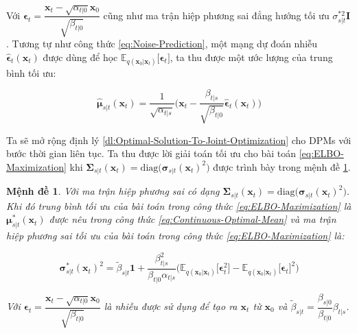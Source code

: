 \documentclass[14pt, a4paper]{article}
\numberwithin{equation}{section}
\numberwithin{figure}{section}
\newtheorem{md}{Mệnh đề}
\numberwithin{dl}{section}
\numberwithin{md}{section}
\numberwithin{bd}{section}
\numberwithin{dn}{section}
\numberwithin{hq}{section}
\begin{document}
    Với $\boldsymbol{\epsilon}_t = \dfrac{\boldsymbol{x}_t - \sqrt{\alpha_{t \vert 0}} \boldsymbol{x}_0}{\sqrt{\beta_{t \vert 0}}}$ cũng như ma trận hiệp phương sai đẳng hướng tối ưu $\sigma_{s \vert t}^{\ast 2} \boldsymbol{I}$.
    Tương tự như công thức \ref{eq:Noise-Prediction}, một mạng dự đoán nhiễu $\hat{\boldsymbol{\epsilon}}_t (\boldsymbol{x}_t)$ được dùng để học $\mathbb{E}_{q(\boldsymbol{x}_0 \vert \boldsymbol{x}_t)}  \lbrack \boldsymbol{\epsilon}_t \rbrack$,
    ta thu được một ước lượng của trung bình tối ưu:

    \begin{equation} \label{eq:Estimated-Continuous-Optimal-Mean}
        \hat{\boldsymbol{\mu}}_{s \vert t} (\boldsymbol{x}_t) = \dfrac{1}{\sqrt{\alpha_{t \vert s}}} \Big( \boldsymbol{x}_t - \dfrac{\beta_{t \vert s}}{\sqrt{\beta_{t \vert 0}}} \hat{\boldsymbol{\epsilon}}_t (\boldsymbol{x}_t) \Big)
    \end{equation}

    Ta sẽ mở rộng định lý \ref{dl:Optimal-Solution-To-Joint-Optimization} cho DPMs với bước thời gian liên tục.
    Ta thu được lời giải toán tối ưu cho bài toán \ref{eq:ELBO-Maximization} khi $\boldsymbol{\Sigma}_{s \vert t} (\boldsymbol{x}_t)=\mathrm{diag}\big(\boldsymbol{\sigma}_{s \vert t} (\boldsymbol{x}_t)^2 \big)$ được trình bày trong mệnh đề \ref{md:Continuous-Optimal-Covariance}.

    \begin{md} \label{md:Continuous-Optimal-Covariance}
        Với ma trận hiệp phương sai có dạng $\boldsymbol{\Sigma}_{s \vert t} (\boldsymbol{x}_t)=\mathrm{diag}\big(\boldsymbol{\sigma}_{s \vert t} (\boldsymbol{x}_t)^2 \big)$.
        Khi đó trung bình tối ưu của bài toán trong công thức \ref{eq:ELBO-Maximization} là $\boldsymbol{\mu}_{s \vert t}^{\ast} (\boldsymbol{x}_t)$ được nêu trong công thức \ref{eq:Continuous-Optimal-Mean} và ma trận hiệp phương sai tối ưu của bài toán trong công thức \ref{eq:ELBO-Maximization} là:

        \begin{equation*}
            \boldsymbol{\sigma}_{s \vert t}^{\ast} (\boldsymbol{x}_t)^2 = \tilde{\beta}_{s \vert t} \boldsymbol{1} + \dfrac{\beta_{t \vert s}^2}{\beta_{t \vert 0} \alpha_{t \vert s}} \Big( \mathbb{E}_{q(\boldsymbol{x}_0 \vert \boldsymbol{x}_t)} \lbrack \boldsymbol{\epsilon}_t^2 \rbrack - \mathbb{E}_{q(\boldsymbol{x}_0 \vert \boldsymbol{x}_t)} \lbrack \boldsymbol{\epsilon}_t \rbrack^2 \Big)
        \end{equation*}

        Với $\boldsymbol{\epsilon}_t = \dfrac{\boldsymbol{x}_t - \sqrt{\alpha_{t \vert 0}} \boldsymbol{x}_0}{\sqrt{\beta_{t \vert 0}}}$ là nhiễu được sử dụng để tạo ra $\boldsymbol{x}_t$ từ $\boldsymbol{x}_0$ và $\tilde{\beta}_{s \vert t} = \dfrac{\beta_{s \vert 0}}{\beta_{t \vert 0}} \beta_{t \vert s}$.
    \end{md}
\end{document}
